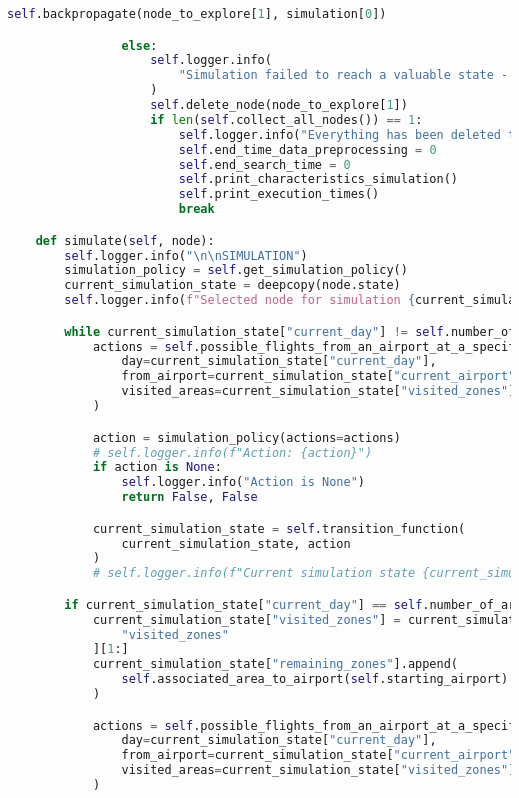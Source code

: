 \begin{lstlisting}[language = Python]
                    self.backpropagate(node_to_explore[1], simulation[0])

                else:
                    self.logger.info(
                        "Simulation failed to reach a valuable state - node deleted"
                    )
                    self.delete_node(node_to_explore[1])
                    if len(self.collect_all_nodes()) == 1:
                        self.logger.info("Everything has been deleted to the root node")
                        self.end_time_data_preprocessing = 0
                        self.end_search_time = 0
                        self.print_characteristics_simulation()
                        self.print_execution_times()
                        break

    def simulate(self, node):
        self.logger.info("\n\nSIMULATION")
        simulation_policy = self.get_simulation_policy()
        current_simulation_state = deepcopy(node.state)
        self.logger.info(f"Selected node for simulation {current_simulation_state}")

        while current_simulation_state["current_day"] != self.number_of_areas:
            actions = self.possible_flights_from_an_airport_at_a_specific_day_with_previous_areas(
                day=current_simulation_state["current_day"],
                from_airport=current_simulation_state["current_airport"],
                visited_areas=current_simulation_state["visited_zones"],
            )

            action = simulation_policy(actions=actions)
            # self.logger.info(f"Action: {action}")
            if action is None:
                self.logger.info("Action is None")
                return False, False

            current_simulation_state = self.transition_function(
                current_simulation_state, action
            )
            # self.logger.info(f"Current simulation state {current_simulation_state}")

        if current_simulation_state["current_day"] == self.number_of_areas:
            current_simulation_state["visited_zones"] = current_simulation_state[
                "visited_zones"
            ][1:]
            current_simulation_state["remaining_zones"].append(
                self.associated_area_to_airport(self.starting_airport)
            )

            actions = self.possible_flights_from_an_airport_at_a_specific_day_with_previous_areas(
                day=current_simulation_state["current_day"],
                from_airport=current_simulation_state["current_airport"],
                visited_areas=current_simulation_state["visited_zones"],
            )


\end{lstlisting}
